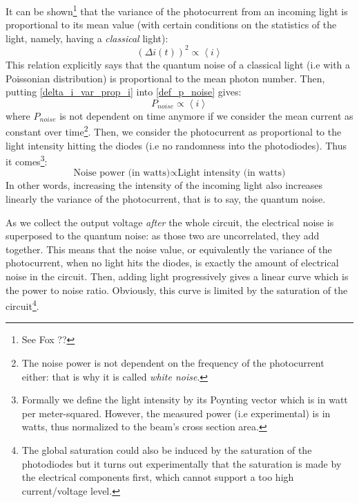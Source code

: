 \documentclass[11pt]{report}
\begin{document}
It can be shown\footnote{See Fox ??} that the variance of the photocurrent from an incoming light is proportional to its mean value (with certain conditions on the statistics of the light, namely, having a \textit{classical} light):
\begin{equation}
\label{delta_i_var_prop_i}
(\Delta i(t))^2 \propto \left\langle i \right\rangle
\end{equation}
This relation explicitly says that the quantum noise of a classical light (i.e with a Poissonian distribution) is proportional to the mean photon number. Then, putting \eqref{delta_i_var_prop_i} into \eqref{def_p_noise} gives:
\begin{equation}
\label{p_noise_i_mean}
P_{noise} \propto \left\langle i \right\rangle
\end{equation}
where $P_{noise}$ is not dependent on time anymore if we consider the mean current as constant over time\footnote{The noise power is not dependent on the frequency of the photocurrent either: that is why it is called \textit{white noise}.}. Then, we consider the photocurrent as proportional to the light intensity hitting the diodes (i.e no randomness into the photodiodes). Thus it comes\footnote{Formally we define the light intensity by its Poynting vector which is in watt per meter-squared. However, the measured power (i.e experimental) is in watts, thus normalized to the beam's cross section area.}:
\begin{equation}
\textrm{Noise power (in watts)} \propto \textrm{Light intensity (in watts)}
\end{equation}
In other words, increasing the intensity of the incoming light also increases linearly the variance of the photocurrent, that is to say, the quantum noise.

As we collect the output voltage \textit{after} the whole circuit, the electrical noise is superposed to the quantum noise: as those two are uncorrelated, they add together. This means that the noise value, or equivalently the variance of the photocurrent, when no light hits the diodes, is exactly the amount of electrical noise in the circuit. Then, adding light progressively gives a linear curve which is the power to noise ratio. Obviously, this curve is limited by the saturation of the circuit\footnote{The global saturation could also be induced by the saturation of the photodiodes but it turns out experimentally that the saturation is made by the electrical components first, which cannot support a too high current/voltage level.}.
\end{document}
